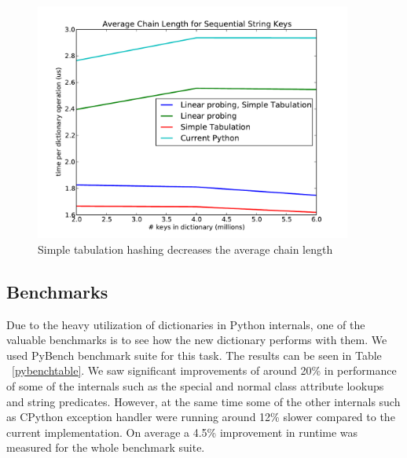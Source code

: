 \documentclass[runningheads,a4paper]{llncs}
\begin{document}
\begin{figure}
  \centering
  \includegraphics[width=4.1in]{chainlength.pdf}
  \caption{Simple tabulation hashing decreases the average chain length}
  \label{fig:chainlength}
\end{figure}

\subsection{Benchmarks}
Due to the heavy utilization of dictionaries in Python internals, one of the
valuable benchmarks is to see how the new dictionary performs with them. We used
PyBench benchmark suite \cite{pybench} for this task. The results can be seen in Table
~\ref{pybenchtable}.  We saw significant improvements of around
20\% in performance of some of the internals such as the special and normal
class attribute lookups and string predicates. However, at the same time some
of the other internals such as CPython exception handler were running around
12\% slower compared to the current implementation. On average a 4.5\% improvement in runtime was measured for the whole benchmark suite.
\end{document}
